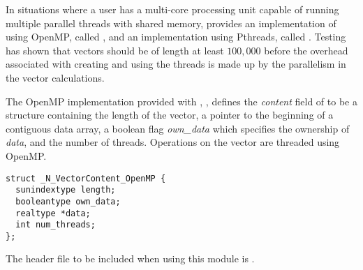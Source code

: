 
In situations where a user has a multi-core processing unit capable of
running multiple parallel threads with shared memory, {\sundials} provides
an implementation of {\nvector} using OpenMP, called {\nvecopenmp}, and
an implementation using Pthreads, called {\nvecpthreads}.  
Testing has shown that vectors should be of length at least $100,000$ 
before the overhead associated with creating and using the threads is
made up by the parallelism in the vector calculations. 

The OpenMP {\nvector} implementation provided with {\sundials},
{\nvecopenmp}, defines the {\em content} field of  to be a structure 
containing the length of the vector, a pointer to the beginning of a contiguous 
data array, a boolean flag {\em own\_data} which specifies the ownership 
of {\em data}, and the number of threads.  
Operations on the vector are threaded using OpenMP.
\begin{verbatim} 
struct _N_VectorContent_OpenMP {
  sunindextype length;
  booleantype own_data;
  realtype *data;
  int num_threads;
};
\end{verbatim}

The header file to be included when using this module is .

